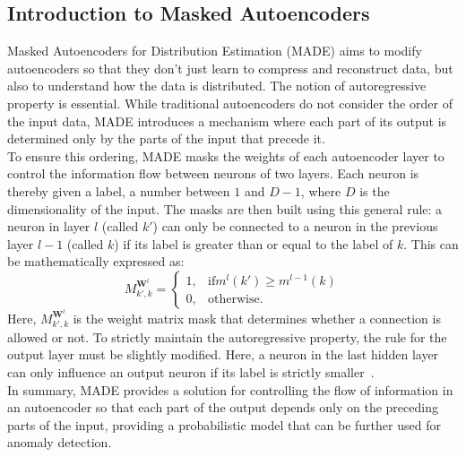 \subsection{Introduction to Masked Autoencoders}
Masked Autoencoders for Distribution Estimation (MADE) aims to modify autoencoders so that they don't just learn to compress and reconstruct data, but also to understand how the data is distributed. The notion of autoregressive property is essential. While traditional autoencoders do not consider the order of the input data, MADE introduces a mechanism where each part of its output is determined only by the parts of the input that precede it.\\
To ensure this ordering, MADE masks the weights of each autoencoder layer to control the information flow between neurons of two layers. Each neuron is thereby given a label, a number between $1$ and $D-1$, where $D$ is the dimensionality of the input. The masks are then built using this general rule: a neuron in layer $l$ (called $k'$) can only be connected to a neuron in the previous layer $l-1$ (called $k$) if its label is greater than or equal to the label of $k$. This can be mathematically expressed as:
\[ M^{\mathbf{W}^l}_{k',k}=\begin{cases}
    1, & \text{if} m^l(k')\geq m^{l-1}(k) \\
    0, & \text{otherwise.}
  \end{cases} \]
Here, $M^{\mathbf{W}^l}_{k',k}$ is the weight matrix mask that determines whether a connection is allowed or not. To strictly maintain the autoregressive property, the rule for the output layer must be slightly modified. Here, a neuron in the last hidden layer can only influence an output neuron if its label is strictly smaller~\cite{germain2015made}.\\
In summary, MADE provides a solution for controlling the flow of information in an autoencoder so that each part of the output depends only on the preceding parts of the input, providing a probabilistic model that can be further used for anomaly detection.



